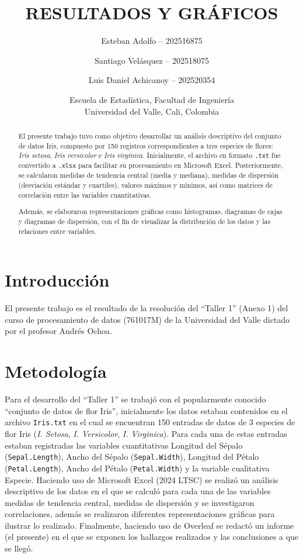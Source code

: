 \documentclass[12pt,a4paper]{article}
\title{\textbf{RESULTADOS Y GRÁFICOS}}
\author{
    Esteban Adolfo -- 202516875 \and
    Santiago Velásquez -- 202518075 \and
    Luis Daniel Achicanoy -- 202520354
}
\date{
    Escuela de Estadística, Facultad de Ingeniería\\
    Universidad del Valle, Cali, Colombia
}
\begin{document}
\maketitle

\begin{abstract}
El presente trabajo tuvo como objetivo desarrollar un análisis descriptivo del conjunto de datos Iris, compuesto por 150 registros correspondientes a tres especies de flores: \textit{Iris setosa}, \textit{Iris versicolor} e \textit{Iris virginica}. Inicialmente, el archivo en formato \texttt{.txt} fue convertido a \texttt{.xlsx} para facilitar su procesamiento en Microsoft Excel. Posteriormente, se calcularon medidas de tendencia central (media y mediana), medidas de dispersión (desviación estándar y cuartiles), valores máximos y mínimos, así como matrices de correlación entre las variables cuantitativas.

Además, se elaboraron representaciones gráficas como histogramas, diagramas de cajas y diagramas de dispersión, con el fin de visualizar la distribución de los datos y las relaciones entre variables.
\end{abstract}

\section{Introducción}

El presente trabajo es el resultado de la resolución del ``Taller 1'' (Anexo 1) del curso de procesamiento de datos (761017M) de la Universidad del Valle dictado por el profesor Andrés Ochoa.

\section{Metodología}

Para el desarrollo del ``Taller 1'' se trabajó con el popularmente conocido ``conjunto de datos de flor Iris'', inicialmente los datos estaban contenidos en el archivo \texttt{Iris.txt} en el cual se encuentran 150 entradas de datos de 3 especies de flor Iris (\textit{I. Setosa}, \textit{I. Versicolor}, \textit{I. Virginica}). Para cada una de estas entradas estaban registradas las variables cuantitativas Longitud del Sépalo (\texttt{Sepal.Length}), Ancho del Sépalo (\texttt{Sepal.Width}), Longitud del Pétalo (\texttt{Petal.Length}), Ancho del Pétalo (\texttt{Petal.Width}) y la variable cualitativa Especie. Haciendo uso de Microsoft Excel (2024 LTSC) se realizó un análisis descriptivo de los datos en el que se calculó para cada una de las variables medidas de tendencia central, medidas de dispersión y se investigaron correlaciones, además se realizaron diferentes representaciones gráficas para ilustrar lo realizado. Finalmente, haciendo uso de Overleaf se redactó un informe (el presente) en el que se exponen los hallazgos realizados y las conclusiones a que se llegó.
\end{document}
